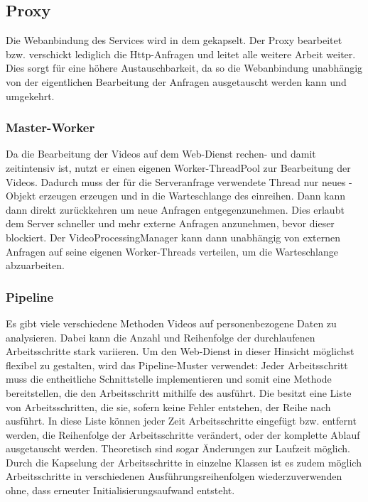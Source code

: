 \subsection{Proxy} \label{service:pattern:proxy}
Die Webanbindung des Services wird in dem  gekapselt. Der Proxy bearbeitet bzw. verschickt lediglich die Http-Anfragen und leitet alle weitere Arbeit weiter. Dies sorgt für eine höhere Austauschbarkeit, da so die Webanbindung unabhängig von der eigentlichen Bearbeitung der Anfragen ausgetauscht werden kann und umgekehrt.

\subsubsection{Master-Worker} \label{service:pattern:masterworker}
Da die Bearbeitung der Videos auf dem Web-Dienst rechen- und damit zeitintensiv ist, nutzt er einen eigenen Worker-ThreadPool zur Bearbeitung der Videos. Dadurch muss der für die Serveranfrage verwendete Thread nur neues -Objekt erzeugen erzeugen und in die Warteschlange des  einreihen. Dann kann dann direkt zurückkehren um neue Anfragen entgegenzunehmen. Dies erlaubt dem Server schneller und mehr externe Anfragen anzunehmen, bevor dieser blockiert.\newline
Der VideoProcessingManager kann dann unabhängig von externen Anfragen auf seine eigenen Worker-Threads verteilen, um die Warteschlange abzuarbeiten.

\subsubsection{Pipeline} \label{service:pattern:pipeline}
Es gibt viele verschiedene Methoden Videos auf personenbezogene Daten zu analysieren. Dabei kann die Anzahl und Reihenfolge der durchlaufenen Arbeitsschritte stark variieren. Um den Web-Dienst in dieser Hinsicht möglichst flexibel zu gestalten, wird das Pipeline-Muster verwendet: \newline
Jeder Arbeitsschritt muss die entheitliche Schnittstelle  implementieren und somit eine Methode bereitstellen, die den Arbeitsschritt mithilfe des  ausführt.\newline
Die  besitzt eine Liste von Arbeitsschritten, die sie, sofern keine Fehler entstehen, der Reihe nach ausführt. In diese Liste können jeder Zeit Arbeitsschritte eingefügt bzw. entfernt werden, die Reihenfolge der Arbeitsschritte verändert, oder der komplette Ablauf ausgetauscht werden. Theoretisch sind sogar Änderungen zur Laufzeit möglich.\newline
Durch die Kapselung der Arbeitsschritte in einzelne Klassen ist es zudem möglich Arbeitsschritte in verschiedenen Ausführungsreihenfolgen wiederzuverwenden ohne, dass erneuter Initialisierungsaufwand entsteht.

